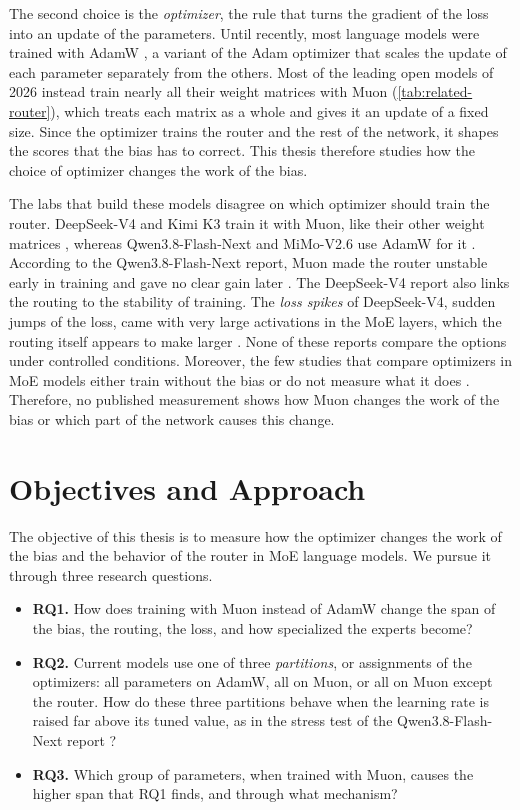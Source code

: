 The second choice is the \emph{optimizer}, the rule that turns the gradient of the loss into an update of the parameters. Until recently, most language models were trained with AdamW \cite{loshchilov2019decoupled}, a variant of the Adam optimizer \cite{kingma2015adam} that scales the update of each parameter separately from the others. Most of the leading open models of 2026 instead train nearly all their weight matrices with Muon \cite{jordan2024muon, liu2025moonlight} (\cref{tab:related-router}), which treats each matrix as a whole and gives it an update of a fixed size. Since the optimizer trains the router and the rest of the network, it shapes the scores that the bias has to correct. This thesis therefore studies how the choice of optimizer changes the work of the bias.

The labs that build these models disagree on which optimizer should train the router. DeepSeek-V4 and Kimi K3 train it with Muon, like their other weight matrices \cite{deepseek2026v4, kimi2026k3}, whereas Qwen3.8-Flash-Next and MiMo-V2.6 use AdamW for it \cite{qiu2026qwennext, xiaomi2026mimov26}. According to the Qwen3.8-Flash-Next report, Muon made the router unstable early in training and gave no clear gain later \cite{qiu2026qwennext}. The DeepSeek-V4 report also links the routing to the stability of training. The \emph{loss spikes} of DeepSeek-V4, sudden jumps of the loss, came with very large activations in the MoE layers, which the routing itself appears to make larger \cite{deepseek2026v4}. None of these reports compare the options under controlled conditions. Moreover, the few studies that compare optimizers in MoE models either train without the bias or do not measure what it does \cite{wang2026depth, lau2026symmetry, srivastava2026lossfree}. Therefore, no published measurement shows how Muon changes the work of the bias or which part of the network causes this change.

\section{Objectives and Approach}
\label{sec:introduction-objectives}
The objective of this thesis is to measure how the optimizer changes the work of the bias and the behavior of the router in MoE language models. We pursue it through three research questions.
\begin{itemize}
  \item \textbf{RQ1.} How does training with Muon instead of AdamW change the span of the bias, the routing, the loss, and how specialized the experts become?
  \item \textbf{RQ2.} Current models use one of three \emph{partitions}, or assignments of the optimizers: all parameters on AdamW, all on Muon, or all on Muon except the router. How do these three partitions behave when the learning rate is raised far above its tuned value, as in the stress test of the Qwen3.8-Flash-Next report \cite{qiu2026qwennext}?
  \item \textbf{RQ3.} Which group of parameters, when trained with Muon, causes the higher span that RQ1 finds, and through what mechanism?
\end{itemize}

